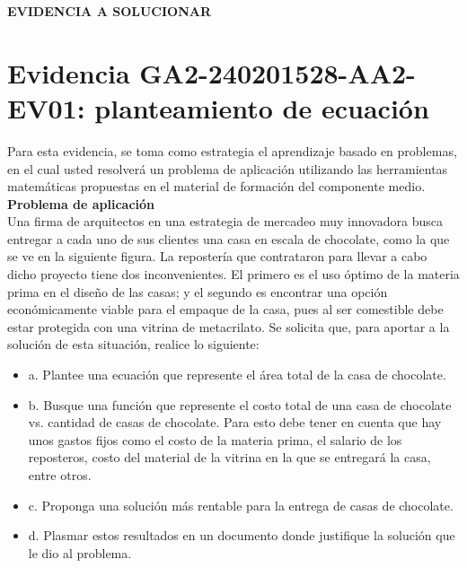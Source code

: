 \documentclass{article}
\theoremstyle{mytheoremstyle}
\theoremstyle{mytheoremstyle}
\theoremstyle{myproblemstyle}
\begin{document}
\begin{flushleft}
    \large \textbf{EVIDENCIA A SOLUCIONAR}\\
    \vspace{0.5cm}
    \section*{Evidencia GA2-240201528-AA2-EV01: planteamiento de ecuación}
Para esta evidencia, se toma como estrategia el aprendizaje basado en problemas, en el cual usted resolverá un problema de aplicación utilizando las herramientas matemáticas propuestas en el material de formación del componente medio.
\newline
\large \textbf{Problema de aplicación}\\
Una firma de arquitectos en una estrategia de mercadeo muy innovadora busca entregar a cada uno de sus clientes una casa en escala de chocolate, como la que se ve en la siguiente figura.
La repostería que contrataron para llevar a cabo dicho proyecto tiene dos inconvenientes. El primero es el uso óptimo de la materia prima en el diseño de las casas; y el segundo es encontrar una opción económicamente viable para el empaque de la casa, pues al ser comestible debe estar protegida con una vitrina de metacrilato.
Se solicita que, para aportar a la solución de esta situación, realice lo siguiente:

    \begin{itemize}
        \item a. Plantee una ecuación que represente el área total de la casa de chocolate.
        \item b. Busque una función que represente el costo total de una casa de chocolate vs. cantidad de casas de chocolate. Para esto debe tener en cuenta que hay unos gastos fijos como el costo de la materia prima, el salario de los reposteros, costo del material de la vitrina en la que se entregará la casa, entre otros.
        \item c. Proponga una solución más rentable para la entrega de casas de chocolate.
        \item d. Plasmar estos resultados en un documento donde justifique la solución que le dio al problema.
         \end{itemize} 
    \end{flushleft}
    \newpage
    \tableofcontents
    \newpage
\end{document}
